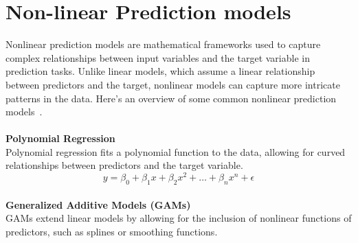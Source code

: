 \documentclass[12pt]{report}
\begin{document}
\section{Non-linear Prediction models}

Nonlinear prediction models are mathematical frameworks used to capture complex relationships
between input variables and the target variable in prediction tasks. Unlike linear models,
which assume a linear relationship between predictors and the target, nonlinear models can
capture more intricate patterns in the data. Here's an overview of some common nonlinear
prediction models~\cite{WOS:000980444400020}.\\
\\
\textbf{Polynomial Regression}\\
Polynomial regression fits a polynomial function to the data, allowing for curved
relationships between predictors and the target variable.\\

\begin{equation}
    y = \beta_0 + \beta_1 x + \beta_2 x^2 + \ldots + \beta_n x^n + \epsilon
\end{equation}
\\
\textbf{Generalized Additive Models (GAMs)}\\
GAMs extend linear models by allowing for the inclusion of nonlinear functions of predictors,
such as splines or smoothing functions.\\
\end{document}
